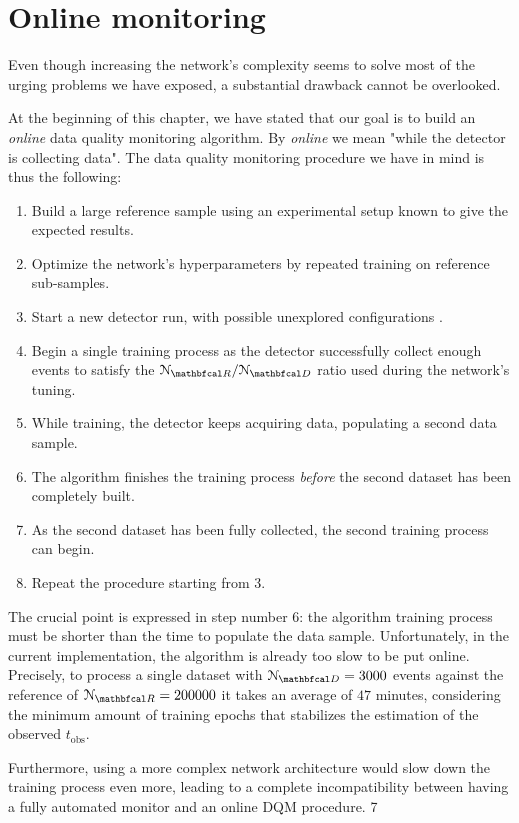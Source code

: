 \section{Online monitoring}

Even though increasing the network's complexity seems to solve most of the urging problems we have exposed, a
substantial drawback cannot be overlooked. 

At the beginning of this chapter, we have stated that our goal is to build an \textit{online} data quality monitoring
algorithm. By \textit{online} we mean "while the detector is collecting data". The data quality monitoring procedure we
have in mind is thus the following: 

\begin{enumerate}
    \item Build a large reference sample using an experimental setup known to give the expected results. 
    \item Optimize the network's hyperparameters by repeated training on reference sub-samples.
    \item Start a new detector run, with possible unexplored configurations .
    \item Begin a single training process as the detector successfully collect enough events to satisfy the
    $\mathcal{N}_{\R}/\mathcal{N}_{\D}$ ratio used during the network's tuning.
    \item While training, the detector keeps acquiring data, populating a second data sample.
    \item The algorithm finishes the training process \textit{before} the second dataset has been completely built.
    \item As the second dataset has been fully collected, the second training process can begin.
    \item Repeat the procedure starting from 3.
\end{enumerate}

The crucial point is expressed in step number $6$: the algorithm training process must be shorter than the time to
populate the data sample. Unfortunately, in the current implementation, the algorithm is already too slow to be put
online. Precisely, to process a single dataset with $\mathcal{N}_{\D}=3000$ events against the reference of
$\mathcal{N}_{\R}=200000$ it takes an average of $47$ minutes, considering the minimum amount of training epochs that
stabilizes the estimation of the observed $t_{\text{obs}}$. 

Furthermore, using a more complex network architecture would slow down the training process even more, leading to
a complete incompatibility between having a fully automated monitor and an online DQM procedure. 7

